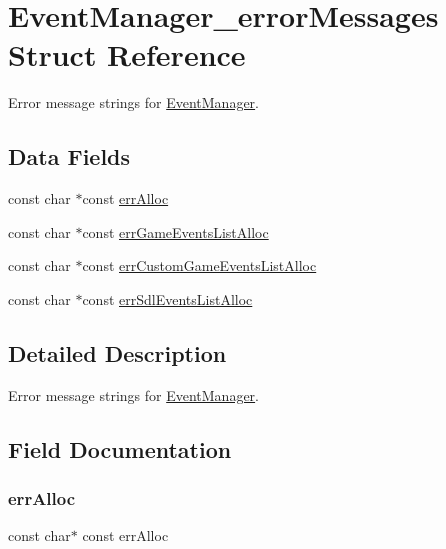 \hypertarget{struct_event_manager__error_messages}{}\section{Event\+Manager\+\_\+error\+Messages Struct Reference}
\label{struct_event_manager__error_messages}


Error message strings for \hyperlink{struct_event_manager}{Event\+Manager}.  


\subsection*{Data Fields}
\begin{DoxyCompactItemize}
\item 
const char $\ast$const \hyperlink{struct_event_manager__error_messages_a0e28ceae89fe4b66ac6df69bbc36690e}{err\+Alloc}
\item 
const char $\ast$const \hyperlink{struct_event_manager__error_messages_a46f0603004a3be0585c1f4294307140e}{err\+Game\+Events\+List\+Alloc}
\item 
const char $\ast$const \hyperlink{struct_event_manager__error_messages_a37b2753fbfa3245a819e59edc3c65161}{err\+Custom\+Game\+Events\+List\+Alloc}
\item 
const char $\ast$const \hyperlink{struct_event_manager__error_messages_a9a9cd78acd092348d638117c5b717278}{err\+Sdl\+Events\+List\+Alloc}
\end{DoxyCompactItemize}


\subsection{Detailed Description}
Error message strings for \hyperlink{struct_event_manager}{Event\+Manager}. 

\subsection{Field Documentation}
\hypertarget{struct_event_manager__error_messages_a0e28ceae89fe4b66ac6df69bbc36690e}{}\label{struct_event_manager__error_messages_a0e28ceae89fe4b66ac6df69bbc36690e} 
\subsubsection{\texorpdfstring{err\+Alloc}{errAlloc}}
{\footnotesize\ttfamily const char$\ast$ const err\+Alloc}

